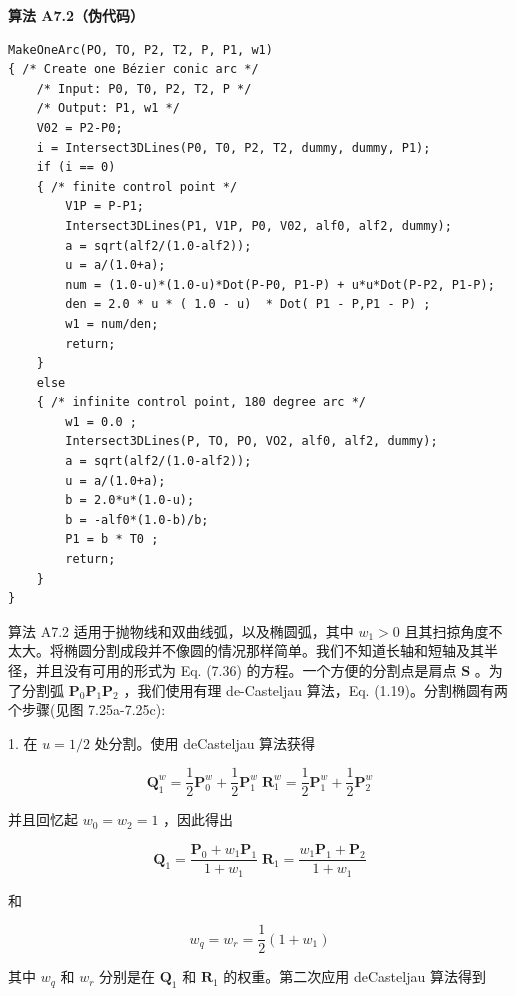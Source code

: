 \documentclass[../main.tex]{subfiles}
\begin{document}
\par\medskip\noindent\textbf{算法 A7.2（伪代码）}\par
\begin{verbatim}
MakeOneArc(PO, TO, P2, T2, P, P1, w1)
{ /* Create one Bézier conic arc */
    /* Input: P0, T0, P2, T2, P */
    /* Output: P1, w1 */
    V02 = P2-P0;
    i = Intersect3DLines(P0, T0, P2, T2, dummy, dummy, P1);
    if (i == 0)
    { /* finite control point */
        V1P = P-P1;
        Intersect3DLines(P1, V1P, P0, V02, alf0, alf2, dummy);
        a = sqrt(alf2/(1.0-alf2));
        u = a/(1.0+a);
        num = (1.0-u)*(1.0-u)*Dot(P-P0, P1-P) + u*u*Dot(P-P2, P1-P);
        den = 2.0 * u * ( 1.0 - u)  * Dot( P1 - P,P1 - P) ;
        w1 = num/den;
        return;
    }
    else
    { /* infinite control point, 180 degree arc */
        w1 = 0.0 ;
        Intersect3DLines(P, TO, PO, VO2, alf0, alf2, dummy);
        a = sqrt(alf2/(1.0-alf2));
        u = a/(1.0+a);
        b = 2.0*u*(1.0-u);
        b = -alf0*(1.0-b)/b;
        P1 = b * T0 ;
        return;
    }
}
\end{verbatim}

算法 A7.2 适用于抛物线和双曲线弧，以及椭圆弧，其中 \({w}_{1} > 0\) 且其扫掠角度不太大。将椭圆分割成段并不像圆的情况那样简单。我们不知道长轴和短轴及其半径，并且没有可用的形式为 Eq. (7.36) 的方程。一个方便的分割点是肩点 \(\mathbf{S}\) 。为了分割弧 \({\mathbf{P}}_{0}{\mathbf{P}}_{1}{\mathbf{P}}_{2}\) ，我们使用有理 de-Casteljau 算法，Eq. (1.19)。分割椭圆有两个步骤(见图 7.25a-7.25c):

1. 在 \(u = 1/2\) 处分割。使用 deCasteljau 算法获得

\[
{\mathbf{Q}}_{1}^{w} = \frac{1}{2}{\mathbf{P}}_{0}^{w} + \frac{1}{2}{\mathbf{P}}_{1}^{w}\;{\mathbf{R}}_{1}^{w} = \frac{1}{2}{\mathbf{P}}_{1}^{w} + \frac{1}{2}{\mathbf{P}}_{2}^{w}
\]



并且回忆起 \({w}_{0} = {w}_{2} = 1\) ，因此得出

\[
{\mathbf{Q}}_{1} = \frac{{\mathbf{P}}_{0} + {w}_{1}{\mathbf{P}}_{1}}{1 + {w}_{1}}\;{\mathbf{R}}_{1} = \frac{{w}_{1}{\mathbf{P}}_{1} + {\mathbf{P}}_{2}}{1 + {w}_{1}} \tag{7.42}
\]

和

\[
{w}_{q} = {w}_{r} = \frac{1}{2}\left( {1 + {w}_{1}}\right)  \tag{7.43}
\]



其中 \({w}_{q}\) 和 \({w}_{r}\) 分别是在 \({\mathbf{Q}}_{1}\) 和 \({\mathbf{R}}_{1}\) 的权重。第二次应用 deCasteljau 算法得到
\end{document}
